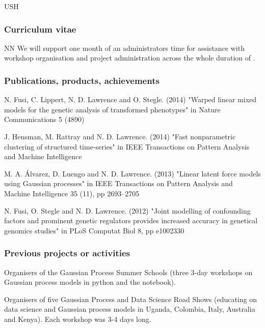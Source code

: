\begin{sitedescription}{USH}
\subsubsection*{Curriculum vitae}


%




\begin{participant}[type=res,PM=1]{NN}
  We will support one month of an administrators time for assistance
  with workshop organisation and project administration across the
  whole duration of \TheProject.
\end{participant}


%

\subsubsection*{Publications, products, achievements}

\begin{compactenum}
\item N. Fusi, C. Lippert, N. D. Lawrence and O. Stegle. (2014) "Warped linear mixed models for the genetic analysis of transformed phenotypes" in Nature Communications 5 (4890)
\item J. Hensman, M. Rattray and N. D. Lawrence. (2014) "Fast nonparametric clustering of structured time-series" in IEEE Transactions on Pattern Analysis and Machine Intelligence
\item M. A. \'Alvarez, D. Luengo and N. D. Lawrence. (2013) "Linear latent force models using Gaussian processes" in IEEE Transactions on Pattern Analysis and Machine Intelligence 35 (11), pp 2693--2705
\item N. Fusi, O. Stegle and N. D. Lawrence. (2012) "Joint modelling of confounding factors and prominent genetic regulators provides increased accuracy in genetical genomics studies" in PLoS Computat Biol 8, pp e1002330
\end{compactenum}

\subsubsection*{Previous projects or activities}

\begin{compactenum}
\item Organisers of the Gaussian Process Summer Schools (three 3-day workshops on Gaussian process models in python and the \IPython notebook).
\item Organisers of five Gaussian Process and Data Science Road Shows (educating on data science and Gaussian process models in Uganda, Colombia, Italy, Australia and Kenya). Each workshop was 3-4 days long.
\end{compactenum}


\end{sitedescription}
